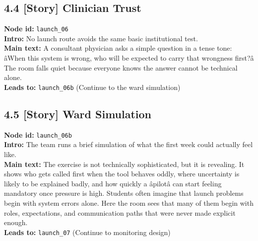 \documentclass[11pt]{article}
\begin{document}
\subsection*{4.4 [Story] Clinician Trust}
\textbf{Node id:} \texttt{launch\_06}\\
\textbf{Intro:} No launch route avoids the same basic institutional test.\\
\textbf{Main text:} A consultant physician asks a simple question in a tense tone: âWhen this system is wrong, who will be expected to carry that wrongness first?â The room falls quiet because everyone knows the answer cannot be technical alone.\\
\textbf{Leads to:} \texttt{launch\_06b} (Continue to the ward simulation)\\
\subsection*{4.5 [Story] Ward Simulation}
\textbf{Node id:} \texttt{launch\_06b}\\
\textbf{Intro:} The team runs a brief simulation of what the first week could actually feel like.\\
\textbf{Main text:} The exercise is not technically sophisticated, but it is revealing. It shows who gets called first when the tool behaves oddly, where uncertainty is likely to be explained badly, and how quickly a âpilotâ can start feeling mandatory once pressure is high. Students often imagine that launch problems begin with system errors alone. Here the room sees that many of them begin with roles, expectations, and communication paths that were never made explicit enough.\\
\textbf{Leads to:} \texttt{launch\_07} (Continue to monitoring design)\\
\end{document}
